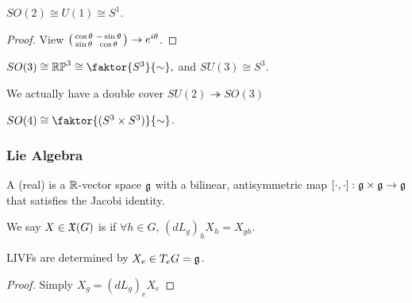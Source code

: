 \documentclass{article}
\begin{document}
\begin{lemma}
\end{lemma}

\begin{lemma}
	$SO(2) \cong U(1) \cong S^1$. 
\end{lemma}
\begin{proof}
	View $\begin{psmallmatrix} \cos \theta & -\sin\theta \\ \sin\theta & \cos\theta \end{psmallmatrix} \to e^{i\theta}$. 
\end{proof}

\begin{lemma}
	$SO(3) \cong \mbb{RP}^3 \cong \faktor{S^3}{\sim},$ and $SU(3) \cong S^3$.
\end{lemma}
\begin{remark}
	We actually have a double cover $SU(2) \twoheadrightarrow SO(3)$
\end{remark}

\begin{lemma}
	$SO(4) \cong \faktor{(S^3 \times S^3)}{\sim}$.
\end{lemma}


\subsubsection{Lie Algebra}

\begin{definition}
A (real)  is a $\mathbb{R}$-vector space $\mathfrak{g}$ with a bilinear, antisymmetric map $\left[ \cdot, \cdot \right] : \mathfrak{g} \times \mathfrak{g} \to \mathfrak{g}$ that satisfies the Jacobi identity. 
\end{definition}

\begin{definition}
	We say $X \in \mathfrak{X}(G)$ is  if $\forall h \in G,\, (dL_g)_h X_h = X_{gh}$.
\end{definition}
 
\begin{lemma}
	LIVFs are determined by $X_e\in T_e G = \mathfrak{g}$.
\end{lemma}
\begin{proof}
	Simply $X_g = (dL_g)_e X_e$ 
\end{proof}
 
\end{document}
